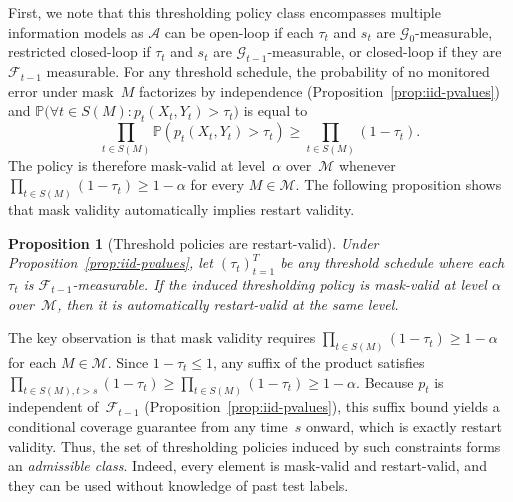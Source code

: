 \documentclass{uai2026} %
\newtheorem{proposition}[theorem]{Proposition}
\newcommand{\1}{\mathbf{1}}
\newcommand{\prob}{\mathbb{P}}
\newcommand{\test}{\mathrm{test}}
\newcommand{\scal}{\mathcal{S}}
\newcommand{\F}{\mathcal{F}}
\newcommand{\G}{\mathcal{G}}
\newcommand{\fcal}{\F}
\newcommand{\mcal}{\mathcal{M}}
\newcommand{\scaltest}{\scal_{\test}}
\newcommand{\acal}{\mathcal{A}}
\begin{document}
First, we note that this thresholding policy class encompasses multiple information models as $\acal$ can be open-loop if each $\tau_t$ and $s_t$ are $\G_0$-measurable, restricted closed-loop if $\tau_t$ and $s_t$ are $\G_{t-1}$-measurable, or closed-loop if they are $\fcal_{t-1}$ measurable. For any threshold schedule, the probability of no monitored error under mask~$M$ factorizes by independence (Proposition~\ref{prop:iid-pvalues}) and $
\prob\bigl(\forall t \in S(M): p_t(X_t, Y_t) > \tau_t\bigr)$ is equal to
\begin{equation}
  \label{eq:product-form}
  \prod_{t \in S(M)} \prob(p_t(X_t, Y_t) > \tau_t)
  \ge \prod_{t \in S(M)} (1 - \tau_t).
\end{equation}
The policy is therefore mask-valid at level~$\alpha$ over~$\mcal$ whenever $\prod_{t \in S(M)} (1 - \tau_t) \ge 1-\alpha$ for every $M \in \mcal$.
The following proposition shows that mask validity automatically implies restart validity.

\begin{proposition}[Threshold policies are restart-valid]
  \label{prop:open-loop-restart}
  Under Proposition~\ref{prop:iid-pvalues}, let $(\tau_t)_{t=1}^T$ be any threshold schedule where each $\tau_t$ is $\F_{t-1}$-measurable.
  If the induced thresholding policy is mask-valid at level $\alpha$ over~$\mcal$, then it is automatically restart-valid at the same level.
\end{proposition}

The key observation is that mask validity requires $\prod_{t \in S(M)} (1-\tau_t) \ge 1-\alpha$ for each $M \in \mcal$.
Since $1-\tau_t \le 1$, any suffix of the product satisfies $\prod_{t \in S(M), t > s} (1-\tau_t) \ge \prod_{t \in S(M)} (1-\tau_t) \ge 1-\alpha$.
Because $p_t$ is independent of~$\F_{t-1}$ (Proposition~\ref{prop:iid-pvalues}), this suffix bound yields a conditional coverage guarantee from any time~$s$ onward, which is exactly restart validity. Thus, the set of thresholding policies induced by such constraints forms an \textit{admissible class}. Indeed,  every element is mask-valid and restart-valid, and they can be used without knowledge of past test labels.  

\end{document}
